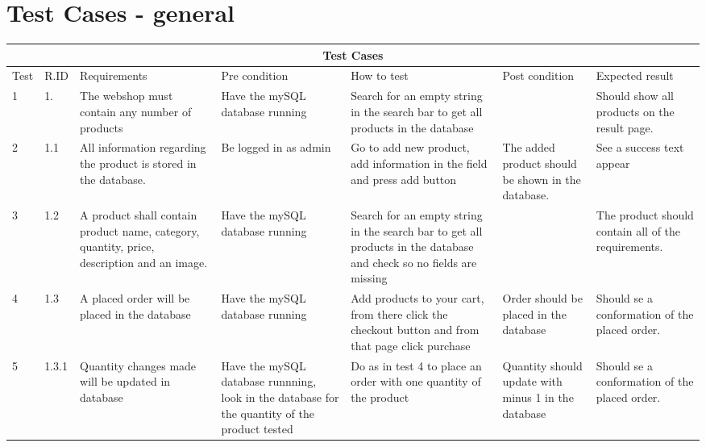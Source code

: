 \documentclass[a4paper,12pt]{article}
\begin{document}
\section{Test Cases - general}

\begin{tabular}{ |p{0.8cm}|p{0.8cm}|p{2.8cm}|p{2.8cm}|p{2.8cm}|p{2.8cm}|p{2.8cm}|}

	\hline
	\multicolumn{7}{|c|}{Test Cases} \\
	\hline
	Test& R.ID & Requirements &Pre condition &How to test& Post condition &Expected result\\
	\hline
	1 & 1. &The webshop must contain any number of products & Have the mySQL database running & Search for an empty string in the search bar to get all products in the database & &Should show all products on the result page.\\
	\hline
	2  & 1.1 & All information regarding the product is stored in the database. & Be logged in as admin & Go to add new product, add information in the field and press add button & The added product should be shown in the database. & See a success text appear\\
	\hline
	3 & 1.2  &A product shall contain product name, category, quantity, price, description and an image.& Have the mySQL database running   &Search for an empty string in the search bar to get all products in the database and check so no fields are missing & &The product should contain all of the requirements.\\
	\hline
	4 & 1.3 &A placed order will be placed in the database& Have the mySQL database running & Add products to your cart, from there click the checkout button and from that page click purchase& Order should be placed in the database & Should se a conformation of the placed order.  \\
	\hline
	5 & 1.3.1 &Quantity changes made will be updated in database& Have the mySQL database runnning, look in the database for the quantity of the product tested & Do as in test 4 to place an order with one quantity of the product & Quantity should update with minus 1 in the database & Should se a conformation of the placed order.\\
	\hline
\end{tabular}
\end{document}
